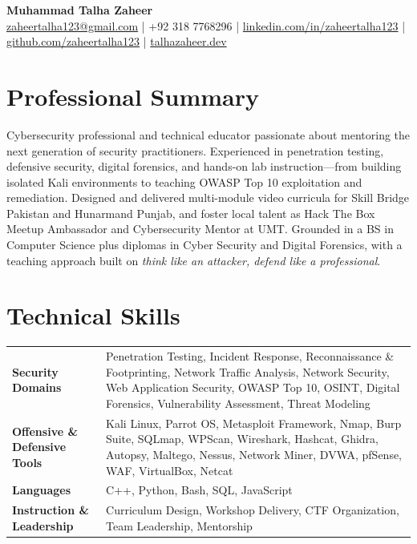 \documentclass[11pt,a4paper]{article}
\begin{document}
\begin{center}
  {\LARGE \textbf{Muhammad Talha Zaheer}} \\[6pt]
  \href{mailto:zaheertalha123@gmail.com}{zaheertalha123@gmail.com} \;|\;
  +92 318 7768296 \;|\;
  \href{https://www.linkedin.com/in/zaheertalha123}{linkedin.com/in/zaheertalha123} \;|\;
  \href{https://github.com/zaheertalha123}{github.com/zaheertalha123} \;|\;
  \href{https://talhazaheer.dev}{talhazaheer.dev}
\end{center}

\vspace{4pt}

\section{Professional Summary}
Cybersecurity professional and technical educator passionate about mentoring the next generation of security practitioners. Experienced in penetration testing, defensive security, digital forensics, and hands-on lab instruction---from building isolated Kali environments to teaching OWASP Top 10 exploitation and remediation. Designed and delivered multi-module video curricula for Skill Bridge Pakistan and Hunarmand Punjab, and foster local talent as Hack The Box Meetup Ambassador and Cybersecurity Mentor at UMT. Grounded in a BS in Computer Science plus diplomas in Cyber Security and Digital Forensics, with a teaching approach built on \textit{think like an attacker, defend like a professional}.

\section{Technical Skills}
\begin{tabularx}{\textwidth}{@{}>{\bfseries}p{1.75in} X@{}}
  Security Domains &
  Penetration Testing, Incident Response, Reconnaissance \& Footprinting, Network Traffic Analysis, Network Security, Web Application Security, OWASP Top 10, OSINT, Digital Forensics, Vulnerability Assessment, Threat Modeling \\
  Offensive \& Defensive Tools &
  Kali Linux, Parrot OS, Metasploit Framework, Nmap, Burp Suite, SQLmap, WPScan, Wireshark, Hashcat, Ghidra, Autopsy, Maltego, Nessus, Network Miner, DVWA, pfSense, WAF, VirtualBox, Netcat \\
  Languages &
  C++, Python, Bash, SQL, JavaScript \\
  Instruction \& Leadership &
  Curriculum Design, Workshop Delivery, CTF Organization, Team Leadership, Mentorship \\
\end{tabularx}
\end{document}
